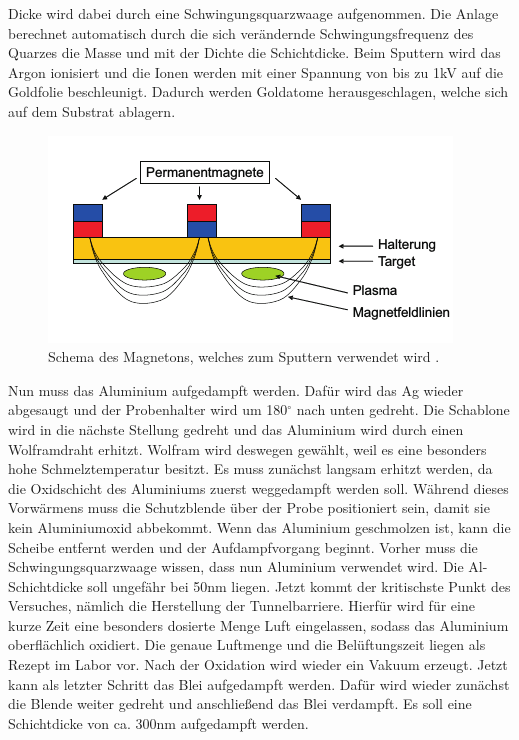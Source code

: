 \documentclass[twoside,        %
               BCOR12mm,       %
               english,ngerman, %
               fleqn,headsepline=false,footsepline=false
              ]{Vorlage/MFPREPORT}
\begin{document}
Dicke wird dabei durch eine Schwingungsquarzwaage aufgenommen. Die Anlage
berechnet automatisch durch die sich verändernde Schwingungsfrequenz des
Quarzes die Masse und mit der Dichte die Schichtdicke. Beim Sputtern wird das
Argon ionisiert und die Ionen werden mit einer Spannung von bis zu 1\;kV auf
die Goldfolie beschleunigt. Dadurch werden Goldatome herausgeschlagen, welche
sich auf dem Substrat ablagern. 
\begin{figure}[]
    \centering
    \includegraphics{fig/magneton.png}
    \caption{Schema des Magnetons, welches zum Sputtern verwendet wird
    \cite{fprakt}.}
    \label{fig:magneton}
\end{figure}
Nun muss das Aluminium aufgedampft werden.  Dafür wird das Ag wieder abgesaugt
und der Probenhalter wird um 180$^\circ$ nach unten gedreht. Die Schablone wird
in die nächste Stellung gedreht und das Aluminium wird durch einen Wolframdraht
erhitzt. Wolfram wird deswegen gewählt, weil es eine besonders hohe
Schmelztemperatur besitzt. Es muss zunächst langsam erhitzt werden, da die
Oxidschicht des Aluminiums zuerst weggedampft werden soll. Während dieses
Vorwärmens muss die Schutzblende über der Probe positioniert sein, damit sie kein
Aluminiumoxid abbekommt. Wenn das Aluminium geschmolzen ist, kann die Scheibe
entfernt werden und der Aufdampfvorgang beginnt. Vorher muss die
Schwingungsquarzwaage wissen, dass nun Aluminium verwendet wird.
Die Al-Schichtdicke soll ungefähr bei 50\;nm liegen.
Jetzt kommt der kritischste Punkt des Versuches, nämlich die Herstellung der
Tunnelbarriere. Hierfür wird für eine kurze Zeit eine besonders dosierte Menge
Luft eingelassen, sodass das Aluminium oberflächlich oxidiert. Die genaue
Luftmenge und die Belüftungszeit liegen als Rezept im Labor vor.
Nach der Oxidation wird wieder ein Vakuum erzeugt. Jetzt kann als letzter
Schritt das Blei aufgedampft werden. Dafür wird wieder zunächst die Blende
weiter gedreht und anschließend das Blei verdampft. Es soll eine Schichtdicke
von ca. 300\;nm aufgedampft werden.
\end{document}

